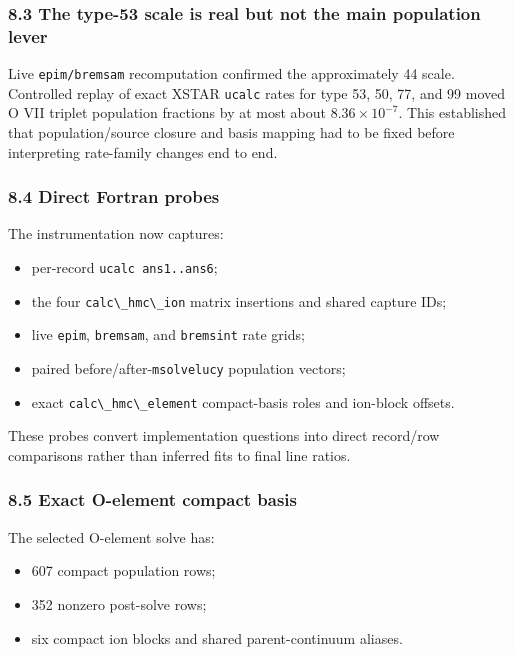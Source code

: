 \documentclass[
  10pt,
]{article}
\newcommand{\passthrough}[1]{#1}
\providecommand{\tightlist}{%
  \setlength{\itemsep}{0pt}\setlength{\parskip}{0pt}}
\begin{document}
\subsubsection{8.3 The type-53 scale is real but not the main population
lever}\label{the-type-53-scale-is-real-but-not-the-main-population-lever}

Live \passthrough{\lstinline!epim/bremsam!} recomputation confirmed the
approximately 44 scale. Controlled replay of exact XSTAR
\passthrough{\lstinline!ucalc!} rates for type 53, 50, 77, and 99 moved
O VII triplet population fractions by at most about
\(8.36\times10^{{-7}}\). This established that population/source closure
and basis mapping had to be fixed before interpreting rate-family
changes end to end.

\subsubsection{8.4 Direct Fortran probes}\label{direct-fortran-probes}

The instrumentation now captures:

\begin{itemize}
\tightlist
\item
  per-record \passthrough{\lstinline!ucalc ans1..ans6!};
\item
  the four \passthrough{\lstinline!calc\_hmc\_ion!} matrix insertions
  and shared capture IDs;
\item
  live \passthrough{\lstinline!epim!},
  \passthrough{\lstinline!bremsam!}, and
  \passthrough{\lstinline!bremsint!} rate grids;
\item
  paired before/after-\passthrough{\lstinline!msolvelucy!} population
  vectors;
\item
  exact \passthrough{\lstinline!calc\_hmc\_element!} compact-basis roles
  and ion-block offsets.
\end{itemize}

These probes convert implementation questions into direct record/row
comparisons rather than inferred fits to final line ratios.

\subsubsection{8.5 Exact O-element compact
basis}\label{exact-o-element-compact-basis}

The selected O-element solve has:

\begin{itemize}
\tightlist
\item
  607 compact population rows;
\item
  352 nonzero post-solve rows;
\item
  six compact ion blocks and shared parent-continuum aliases.
\end{itemize}
\end{document}

